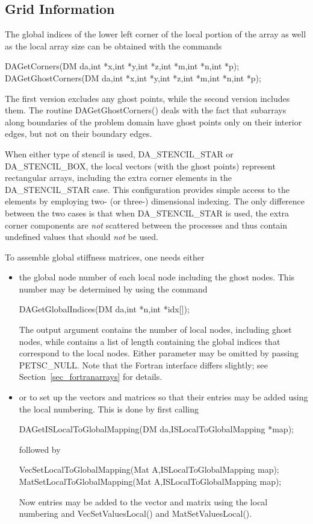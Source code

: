 \subsection{Grid Information}

The global indices of the lower left corner of the local portion of the array 
as well as the local array size can be obtained with the commands
\begin{tabbing}
  DAGetCorners(DM da,int *x,int *y,int *z,int *m,int *n,int *p);\\
  DAGetGhostCorners(DM da,int *x,int *y,int *z,int *m,int *n,int *p);
\end{tabbing}
The first version excludes any ghost points, while the second version
includes them. 
The routine DAGetGhostCorners()
deals with the fact that subarrays along boundaries of the problem
domain have ghost points only on their interior edges, but not on
their boundary edges.

When either type of stencil is used, DA_STENCIL_STAR or 
DA_STENCIL_BOX, the local vectors (with the ghost points) 
represent rectangular arrays, including the extra corner elements in 
the DA_STENCIL_STAR case. This configuration provides simple 
access to the elements by employing two- (or three-) dimensional indexing. 
The only difference between the 
two cases is that when DA_STENCIL_STAR is used, the extra 
corner components are {\em not} scattered between the processes and thus
contain undefined values that should {\em not} be used.

To assemble global stiffness matrices, one needs either 
\begin{itemize}
\item
the global node number of each local node 
including the ghost nodes. This number may be determined by using the 
command 
\begin{tabbing}
  DAGetGlobalIndices(DM da,int *n,int *idx[]);
\end{tabbing}
The output argument  contains the number of 
local nodes, including ghost nodes, while  contains a list of length
 containing the global indices that correspond to the local nodes. Either
parameter may be omitted by passing PETSC_NULL. Note that the Fortran
interface differs slightly; see Section~\ref{sec_fortranarrays} for details.
\item
or to set up the vectors and matrices so that their entries may be
added using the local numbering. This is done by first calling 
\begin{tabbing}
  DAGetISLocalToGlobalMapping(DM da,ISLocalToGlobalMapping *map);
\end{tabbing}
followed by 
\begin{tabbing}
  VecSetLocalToGlobalMapping(Mat A,ISLocalToGlobalMapping map);\\
  MatSetLocalToGlobalMapping(Mat A,ISLocalToGlobalMapping map);
\end{tabbing}
Now entries may be added to the vector and matrix using the local numbering
and VecSetValuesLocal() and MatSetValuesLocal().
\end{itemize}

